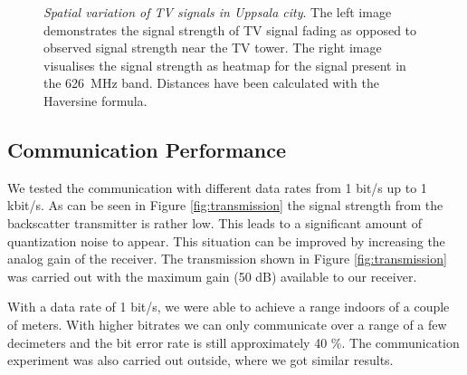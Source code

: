\begin{figure}[h]
\begin{minipage}{0.49\columnwidth}
	\end{minipage}
	\vspace{-6mm}
	\caption{\emph{Spatial variation of TV signals in Uppsala city}. 
	The left image demonstrates the signal strength of TV signal fading	
	as opposed to observed signal strength near the TV tower. 
	The right image visualises the signal strength as heatmap for the signal
	present in the \SI{626}{\mega\hertz} band. Distances have been
calculated with the Haversine formula. }
 	\vspace{-6mm}

\label{fig:haversine}
\end{figure}

\balance

\subsection{Communication Performance}
We tested the communication with different data rates from 1 bit/s up to
1 kbit/s. As can be seen in Figure \ref{fig:transmission} the signal
strength from the backscatter transmitter is rather low. This leads to a
significant amount of quantization noise to appear. This situation can
be improved by increasing the analog gain of the receiver. The
transmission shown in Figure \ref{fig:transmission} was carried out with
the maximum gain (50 dB) available to our receiver. 

With a data rate of 1 bit/s, we were able to achieve a range indoors
of a couple of meters. With higher bitrates we
can only communicate over a range of a few decimeters and the 
bit error rate is still approximately 40 \%. The communication
experiment was also carried out outside, where we got similar results.  